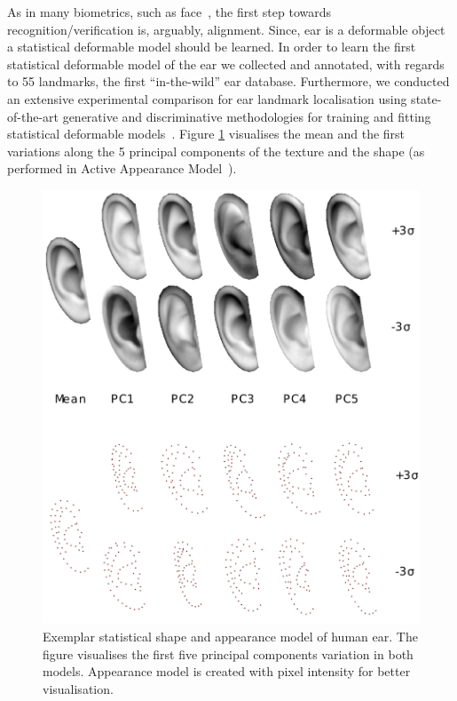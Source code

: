 As in many biometrics, such as face~\cite{taigman2014deepface}, the first step towards recognition/verification is, arguably, alignment. Since, ear is a deformable object a statistical deformable model should be learned. In order to learn the first statistical deformable model of the ear we collected and annotated, with regards to 55 landmarks, the first ``in-the-wild'' ear database. Furthermore, we conducted an extensive experimental comparison for ear landmark localisation using state-of-the-art generative and discriminative methodologies  for training and fitting statistical deformable models~\cite{Cootes1995, Cootes2001, Matthews2004, Saragih2011, Belhumeur2011, Zhu2012,Cao2012, Asthana2013, Tzimiropoulos2014, Asthana2014, antonakos2015feature}. Figure \ref{fig:aam_model} visualises the mean and the first variations along the 5 principal components of the texture and the shape (as performed in Active Appearance Model~\cite{Cootes2001, Matthews2004, Tzimiropoulos2014, antonakos2015feature}).  

\begin{figure}[t!]
    \includegraphics[width=\columnwidth]{resources/Ear_Deformable_Model/models/AAM_model}
    \caption{Exemplar statistical shape and appearance model of human ear. The figure visualises the first five principal components variation in both models. Appearance model is created with pixel intensity for better visualisation.}
    \label{fig:aam_model}
\end{figure}


